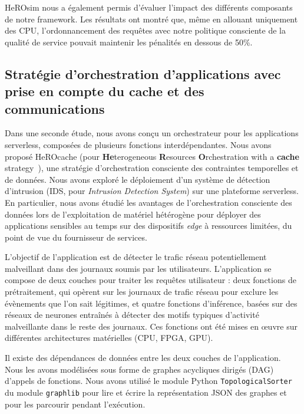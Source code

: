 HeROsim nous a également permis d'évaluer l'impact des différents composants de notre framework. Les résultats ont montré que, même en allouant uniquement des \gls{CPU}, l'ordonnancement des requêtes avec notre politique consciente de la qualité de service pouvait maintenir les pénalités en dessous de 50\%.

\subsection{Stratégie d'orchestration d'applications avec prise en compte du cache et des communications}

Dans une seconde étude, nous avons conçu un orchestrateur pour les applications serverless, composées de plusieurs fonctions interdépendantes. Nous avons proposé HeROcache (pour \textbf{He}terogeneous \textbf{R}esources \textbf{O}rchestration with a \textbf{cache} strategy~\cite{herocache}), une stratégie d'orchestration consciente des contraintes temporelles et de données. Nous avons exploré le déploiement d'un système de détection d'intrusion (\gls{IDS}, pour \textit{Intrusion Detection System}) sur une plateforme serverless. En particulier, nous avons étudié les avantages de l'orchestration consciente des données lors de l'exploitation de matériel hétérogène pour déployer des applications sensibles au temps sur des dispositifs \textit{edge} à ressources limitées, du point de vue du fournisseur de services.

L'objectif de l'application est de détecter le trafic réseau potentiellement malveillant dans des journaux soumis par les utilisateurs.
L'application se compose de deux couches pour traiter les requêtes utilisateur : deux fonctions de prétraitement, qui opèrent sur les journaux de trafic réseau pour exclure les évènements que l'on sait légitimes, et quatre fonctions d'inférence, basées sur des réseaux de neurones entraînés à détecter des motifs typiques d'activité malveillante dans le reste des journaux. Ces fonctions ont été mises en œuvre sur différentes architectures matérielles (\gls{CPU}, \gls{FPGA}, \gls{GPU}).

Il existe des dépendances de données entre les deux couches de l'application. Nous les avons modélisées sous forme de graphes acycliques dirigés (\gls{DAG}) d'appels de fonctions. Nous avons utilisé le module Python \texttt{TopologicalSorter} du module \texttt{graphlib} pour lire et écrire la représentation \gls{JSON} des graphes et pour les parcourir pendant l'exécution.

